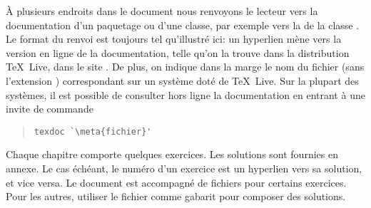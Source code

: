 À plusieurs endroits dans le document nous renvoyons le lecteur vers
la documentation d'un paquetage ou d'une classe, par exemple vers la %
de la classe . Le format du renvoi est toujours tel
qu'illustré ici: un hyperlien mène vers la version en ligne de la
documentation, telle qu'on la trouve dans la distribution {\TeX}~Live,
dans le site %
. De plus, on indique dans la
marge le nom du fichier (sans l'extension ) correspondant
sur un système doté de {\TeX}~Live. Sur la plupart des systèmes, il
est possible de consulter hors ligne la documentation
 en entrant à une invite de commande
\begin{quote}
\begin{lstlisting}[backgroundcolor=\color{white}]
texdoc `\meta{fichier}'
\end{lstlisting}
\end{quote}


Chaque chapitre comporte quelques exercices. Les solutions sont
fournies en annexe. Le cas échéant, le numéro d'un exercice est un
hyperlien vers sa solution, et vice versa. Le document est accompagné
de fichiers pour certains exercices. Pour les autres, utiliser le
fichier  comme gabarit pour composer
des solutions.

